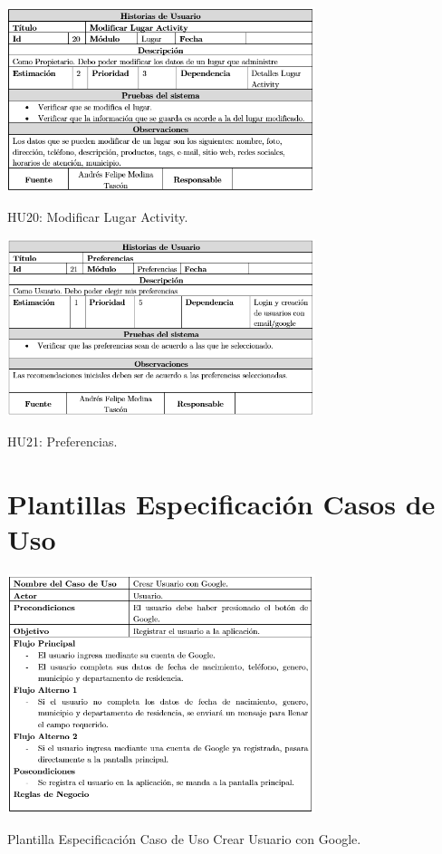 \documentclass[12pt,letterpaper,openany]{book}
\begin{document}
\begin{table}[H]
\centering
\includegraphics[width=9cm]{./imagenes/HU/HU20}
\caption{HU20: Modificar Lugar Activity.}
\end{table}

\begin{table}[H]
\centering
\includegraphics[width=9cm]{./imagenes/HU/HU21}
\caption{HU21: Preferencias.}
\end{table}

\chapter{Plantillas Especificación Casos de Uso}\label{aped.B}
\begin{table}[H]
\centering
\includegraphics[width=9cm]{./imagenes/PCU/crear_usuario_google}
\caption{Plantilla Especificación Caso de Uso Crear Usuario con Google.}
\end{table}
\end{document}
